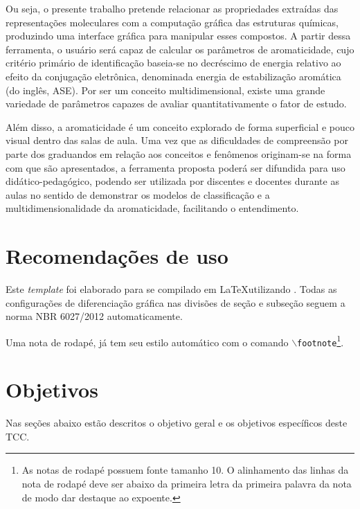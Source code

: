 Ou seja, o presente trabalho pretende relacionar as propriedades extraídas das representações moleculares com a computação gráfica das estruturas químicas, produzindo uma interface gráfica para manipular esses compostos. A partir dessa ferramenta, o usuário será capaz de calcular os parâmetros de aromaticidade, cujo critério primário de identificação baseia-se no decréscimo de energia relativo ao efeito da conjugação eletrônica, denominada energia de estabilização aromática (do inglês, ASE). Por ser um conceito multidimensional, existe uma grande variedade de parâmetros capazes de avaliar quantitativamente o fator de estudo.

Além disso, a aromaticidade é um conceito explorado de forma superficial e pouco visual dentro das salas de aula. Uma vez que as dificuldades de compreensão por parte dos graduandos em relação aos conceitos e fenômenos originam-se na forma com que são apresentados\autocite{Cunha2018}, a ferramenta proposta poderá ser difundida para uso didático-pedagógico, podendo ser utilizada por discentes e docentes durante as aulas no sentido de demonstrar os modelos de classificação e a multidimensionalidade da aromaticidade, facilitando o entendimento.

\section{Recomendações de uso}

Este \emph{template} foi elaborado para se compilado em \LaTeX utilizando \abnTeX.  Todas as configurações de diferenciação gráfica nas divisões de seção e subseção seguem a  norma NBR 6027/2012 automaticamente. 

Uma nota de rodapé, já tem seu estilo automático com o comando \texttt{$\backslash$footnote}\footnote{As notas de rodapé possuem fonte tamanho 10. O alinhamento das linhas da nota de rodapé deve ser abaixo da primeira letra da primeira palavra da nota de modo dar destaque ao expoente.}.


\section{Objetivos}

Nas seções abaixo estão descritos o objetivo geral e os objetivos específicos deste TCC.

